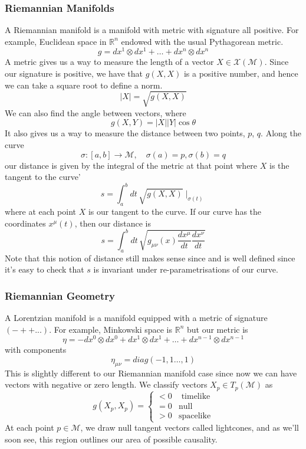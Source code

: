 \documentclass[11pt, a4paper]{article}   	%
\theoremstyle{slplain}
\begin{document}
\subsubsection{Riemannian Manifolds} 
A Riemannian manifold is a manifold with metric 
with signature all positive. 
For example, Euclidean space in $ \mathbb { R} ^ n $ endowed with 
the usual Pythagorean metric. 
\[
g = dx^ 1 \otimes dx ^ 1 + \dots + dx^ n \otimes dx^ n 
\]  A metric gives us a way to measure the
length of a vector $ X \in \mathcal{ X } ( \mathcal{ M } ) $. 
Since our signature is positive, we have that $ g ( X, X ) $ is a 
positive number, and hence we can take a square root to 
define a norm. 
\[
| X | = \sqrt{ g ( X, X ) } 
\] We can also find the angle between vectors, where
\[
g ( X, Y ) = | X| | Y | \cos \theta 
\] It also gives us a way to measure the distance between two points, 
$ p $, $ q $. Along the curve 
\[
\sigma : [ a, b ] \to \mathcal{ M }, \quad \sigma ( a) = p, \sigma ( b ) = q
\] our distance is given by the integral of the metric at 
that point where $ X $ is the tangent to the curve' 
\[
s = \int_ a ^ b dt \, \sqrt{ g ( X, X) } \mid_{ \sigma( t) }  
\] where at each point $ X $ is our tangent to the curve. 
If our curve has the coordinates $ x^ \mu ( t ) $, 
then our distance is 
\[
 s = \int_ a ^ b dt\, \sqrt{ g_{ \mu \nu } ( x) \frac{dx^ \mu }{ dt } \frac{ dx^ \nu }{ dt }} 
\]
Note that this notion of distance still makes sense since and 
is well defined since it's easy to check that 
$ s $ is invariant under re-parametrisations of our curve. 

\subsubsection{Riemannian Geometry} 
A Lorentzian manifold is a manifold equipped with 
a metric of signature $ ( - + + ... ) $. 
For example, Minkowski space is  $ \mathbb{ R} ^ n $
but our metric is 
\[
\eta = - dx^ 0 \otimes dx^ 0 + dx^ 1 \otimes dx^ 1 + \dots + dx^{ n-1 } \otimes dx^{ n- 1}
\] with components
\[
\eta_{ \mu \nu  } = diag ( - 1, 1 \dots, 1 )  
\]  This is slightly different to our Riemannian manifold 
case since now we can have vectors with negative or zero length. 
We classify vectors $ X_ p \in T_p ( \mathcal{ M } ) $
as 
\[
g ( X_p , X_p ) = \begin{cases}
 < 0 & \text{ timelike} \\
 = 0 & \text{null} \\
 > 0 & \text{spacelike}
\end{cases}
\] At each point $ p \in \mathcal{ M } $, we draw null tangent vectors called lightcones, 
and as we'll soon see, this region outlines our area of possible causality.
\end{document}
